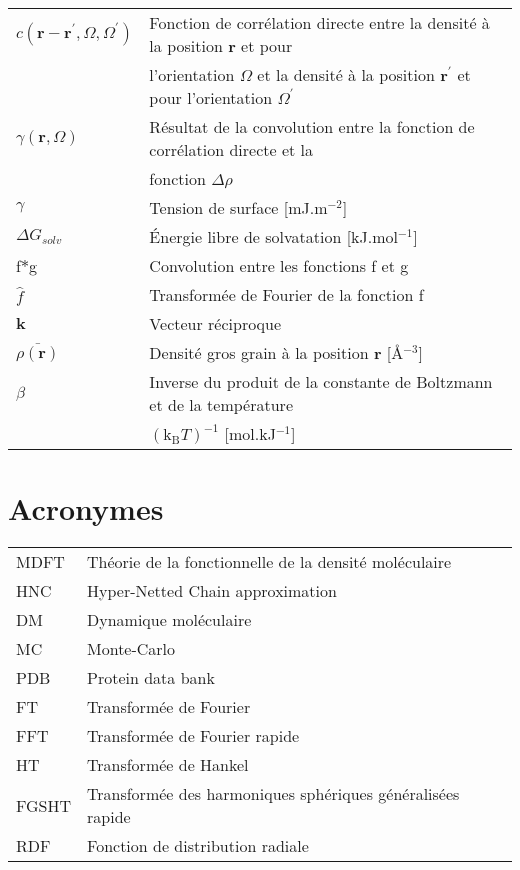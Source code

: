\documentclass{bredele}
\begin{document}
\begin{tabular}{l l}
$c\left(\boldsymbol{r}-\boldsymbol{r}^\prime,\Omega,\Omega^\prime \right)$ & Fonction de corrélation directe entre la densité à la position $\boldsymbol{r}$ et pour \\
 & l'orientation $\Omega$ et la densité à la position $\boldsymbol{r}^\prime$ et pour l'orientation $\Omega^\prime$\\
$\gamma(\boldsymbol{r},\Omega)$ & Résultat de la convolution entre la  fonction de corrélation directe et la\\
& fonction $\Delta\rho$\\
$\gamma$ & Tension de surface [mJ.m$^{-2}$]\\
$\Delta G_{solv}$ & \'Energie libre de solvatation [kJ.mol$^{-1}$]\\
f$\ast$g & Convolution entre les fonctions f et g\\
$\hat{f}$ & Transformée de Fourier de la fonction f\\
$\boldsymbol{k}$ & Vecteur réciproque\\
$\bar{\rho(\boldsymbol{r})}$ & Densité gros grain à la position $\boldsymbol{r}$ [\AA$^{-3}$] \\
$\beta$ & Inverse du produit de la constante de Boltzmann et de la température \\
 & $(\mathrm{k_B}T)^{-1}$ [mol.kJ$^{-1}$]\\
\end{tabular}

\section*{Acronymes}
\begin{tabular}{ll}
MDFT & Théorie de la fonctionnelle de la densité moléculaire\\
HNC & Hyper-Netted Chain approximation\\
DM & Dynamique moléculaire \\
MC & Monte-Carlo \\
PDB & Protein data bank \\
FT & Transformée de Fourier \\
FFT & Transformée de Fourier rapide \\
HT & Transformée de Hankel \\
FGSHT & Transformée des harmoniques sphériques généralisées rapide \\
RDF & Fonction de distribution radiale\\
\end{tabular}
\end{document}
